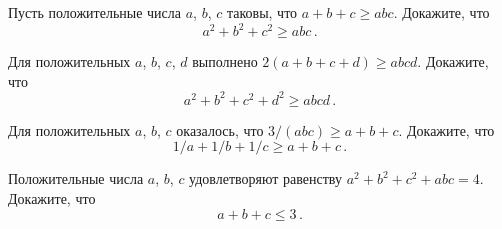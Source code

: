 \begin{problems}

\item
Пусть положительные числа $a$, $b$, $c$ таковы, что $a + b + c \geq abc$.
Докажите, что
\[
    a^2 + b^2 + c^2 \geq a b c
\, . \]

\item
Для положительных $a$, $b$, $c$, $d$ выполнено
\(
    2 (a + b + c + d) \geq a b c d
\).
Докажите, что
\[
    a^2 + b^2 + c^2 + d^2 \geq a b c d
\, . \]

\item
Для положительных $a$, $b$, $c$ оказалось, что
\(
    3 / (a b c) \geq a + b + c
\).
Докажите, что
\[
    1 / a + 1 / b + 1 / c
\geq
    a + b + c
\, . \]

\item
Положительные числа $a$, $b$, $c$ удовлетворяют равенству
\(
    a^2 + b^2 + c^2 + a b c = 4
\).
Докажите, что
\[
    a + b + c \leq 3
\, . \]

\end{problems}

